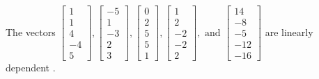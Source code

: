 \begin{exercise}
\begin{exerciseStatement}
  \end{exerciseStatement}
  \begin{exerciseAnswer}
   The vectors \(\left[\begin{array}{r}
1 \\
1 \\
4 \\
-4 \\
5
\end{array}\right] , \left[\begin{array}{r}
-5 \\
1 \\
-3 \\
2 \\
3
\end{array}\right] , \left[\begin{array}{r}
0 \\
2 \\
5 \\
5 \\
1
\end{array}\right] , \left[\begin{array}{r}
1 \\
2 \\
-2 \\
-2 \\
2
\end{array}\right] , \text{ and } \left[\begin{array}{r}
14 \\
-8 \\
-5 \\
-12 \\
-16
\end{array}\right]\) are 
  	 linearly dependent  .
  


  \end{exerciseAnswer}
\end{exercise}